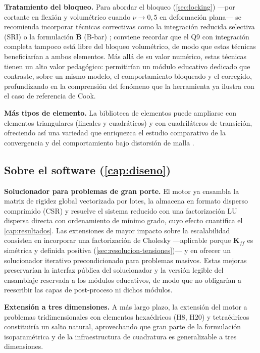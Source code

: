 \textbf{Tratamiento del bloqueo.} Para abordar el bloqueo (\autoref{sec:locking}) —por cortante en flexión y volumétrico cuando $\nu \to 0{,}5$ en deformación plana— se recomienda incorporar técnicas correctivas como la integración reducida selectiva (SRI) o la formulación $\bar{\bm{B}}$ (B-bar) \autocite{hughes2000fem,bathe2014fem}; conviene recordar que el Q9 con integración completa tampoco está libre del bloqueo volumétrico, de modo que estas técnicas beneficiarían a ambos elementos. Más allá de su valor numérico, estas técnicas tienen un alto valor pedagógico: permitirían un módulo educativo dedicado que contraste, sobre un mismo modelo, el comportamiento bloqueado y el corregido, profundizando en la comprensión del fenómeno que la herramienta ya ilustra con el caso de referencia de Cook.

\textbf{Más tipos de elemento.} La biblioteca de elementos puede ampliarse con elementos triangulares (lineales y cuadráticos) y con cuadriláteros de transición, ofreciendo así una variedad que enriquezca el estudio comparativo de la convergencia y del comportamiento bajo distorsión de malla \autocite{onate2009structural,reddy2006introduction}.

\subsection*{Sobre el software (\autoref{cap:diseno})}

\textbf{Solucionador para problemas de gran porte.} El motor ya ensambla la matriz de rigidez global vectorizada por lotes, la almacena en formato disperso comprimido (CSR) y resuelve el sistema reducido con una factorización LU dispersa directa con ordenamiento de mínimo grado, cuyo efecto cuantifica el \autoref{cap:resultados}. Las extensiones de mayor impacto sobre la escalabilidad consisten en incorporar una factorización de Cholesky —aplicable porque $\bm{K}_{ff}$ es simétrica y definida positiva (\autoref{sec:resolucion-tensiones})— y en ofrecer un solucionador iterativo precondicionado para problemas masivos. Estas mejoras preservarían la interfaz pública del solucionador y la versión legible del ensamblaje reservada a los módulos educativos, de modo que no obligarían a reescribir las capas de post-proceso ni dichos módulos.

\textbf{Extensión a tres dimensiones.} A más largo plazo, la extensión del motor a problemas tridimensionales con elementos hexaédricos (H8, H20) y tetraédricos constituiría un salto natural, aprovechando que gran parte de la formulación isoparamétrica y de la infraestructura de cuadratura es generalizable a tres dimensiones.

